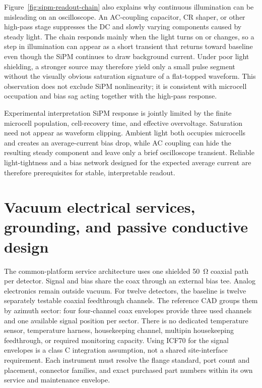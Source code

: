 \documentclass[10pt,letterpaper]{article}
\begin{document}
Figure~\ref{fig:sipm-readout-chain} also explains why continuous illumination can be
misleading on an oscilloscope. An AC-coupling capacitor, CR shaper, or other high-pass
stage suppresses the DC and slowly varying components caused by steady light. The chain
responds mainly when the light turns on or changes, so a step in illumination can appear as
a short transient that returns toward baseline even though the SiPM continues to draw
background current. Under poor light shielding, a stronger source may therefore yield only
a small pulse segment without the visually obvious saturation signature of a flat-topped
waveform. This observation does not exclude SiPM nonlinearity; it is consistent with
microcell occupation and bias sag acting together with the high-pass response.

\begin{notebox}{Experimental interpretation}
  SiPM response is jointly limited by the finite microcell population, cell-recovery time,
  and effective overvoltage. Saturation need not appear as waveform clipping. Ambient light
  both occupies microcells and creates an average-current bias drop, while AC coupling can
  hide the resulting steady component and leave only a brief oscilloscope transient.
  Reliable light-tightness and a bias network designed for the expected average current are
  therefore prerequisites for stable, interpretable readout.
\end{notebox}

\section{Vacuum electrical services, grounding, and passive conductive design}

The common-platform service architecture uses one shielded \SI{50}{\ohm} coaxial path per
detector. Signal and bias share the coax through an external bias tee. Analog electronics
remain outside vacuum. For twelve detectors, the baseline is twelve separately testable
coaxial feedthrough channels. The reference CAD groups them by azimuth sector: four
four-channel coax envelopes provide three used channels and one available signal position
per sector. There is no dedicated temperature sensor, temperature harness, housekeeping
channel, multipin housekeeping feedthrough, or required monitoring capacity. Using ICF70
for the signal envelopes is a class C integration assumption, not a shared site-interface
requirement. Each instrument must resolve the flange standard, port count and placement,
connector families, and exact purchased part numbers within its own service and maintenance
envelope.
\end{document}
